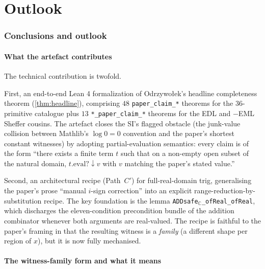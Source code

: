 \documentclass[11pt,a4paper]{article}
\theoremstyle{plain}
\theoremstyle{definition}
\begin{document}
\part{Outlook}

\section{Conclusions and outlook}
\label{sec:conclusions}

\subsection*{What the artefact contributes}

The technical contribution is twofold.

First, an end-to-end Lean 4 formalization of Odrzywołek's headline
completeness theorem (\cref{thm:headline}), comprising $48$
\texttt{paper\_claim\_*} theorems for the $36$-primitive catalogue
plus $13$ \texttt{*\_paper\_claim\_*} theorems for the EDL and
$-\!$EML Sheffer cousins. The artefact closes the SI's flagged
obstacle (the junk-value collision between Mathlib's
$\log 0 = 0$ convention and the paper's shortest constant
witnesses) by adopting partial-evaluation semantics: every claim is
of the form ``there exists a finite term $t$ such that on a non-empty
open subset of the natural domain, $t.\mathrm{eval?}\downarrow v$
with $v$ matching the paper's stated value.''

Second, an architectural recipe (Path~$C'$) for full-real-domain
trig, generalising the paper's prose ``manual $i$-sign correction''
into an explicit range-reduction-by-substitution recipe. The
key foundation is the lemma
\texttt{ADDsafe}$_{\mathbb{C}}$\texttt{\_ofReal\_ofReal}, which
discharges the eleven-condition precondition bundle of the addition
combinator whenever both arguments are real-valued. The recipe is
faithful to the paper's framing in that the resulting witness is a
\emph{family} (a different shape per region of $x$), but it is now
fully mechanised.

\subsection*{The witness-family form and what it means}
\end{document}
